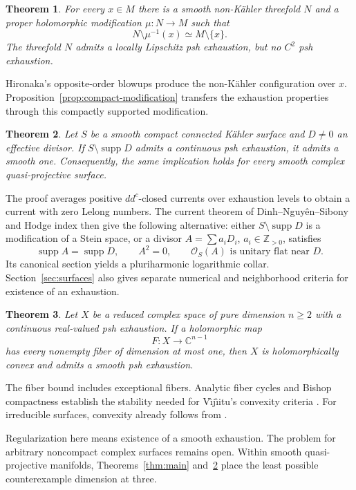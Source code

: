 \documentclass[11pt]{amsart}
\newtheorem{theorem}{Theorem}[section]
\theoremstyle{definition}
\theoremstyle{remark}
\numberwithin{equation}{section}
\newcommand{\C}{\mathbb C}
\newcommand{\OO}{\mathcal O}
\newcommand{\supp}{\operatorname{supp}}
\begin{document}
\begin{theorem}\label{thm:nonkahler-threefold}
For every $x\in M$ there is a smooth non-K\"ahler threefold $N$ and a
proper holomorphic modification $\mu:N\to M$ such that
\[
N\setminus\mu^{-1}(x)\simeq M\setminus\{x\}.
\]
The threefold $N$ admits a locally Lipschitz psh exhaustion, but no
$C^2$ psh exhaustion.
\end{theorem}

Hironaka's opposite-order blowups produce the non-K\"ahler
configuration over $x$. Proposition~\ref{prop:compact-modification}
transfers the exhaustion properties through this compactly supported
modification.

\begin{theorem}\label{thm:surface-introduction}
Let $S$ be a smooth compact connected K\"ahler surface and $D\ne0$
an effective divisor. If $S\setminus\supp D$ admits a continuous
psh exhaustion, it admits a smooth one. Consequently, the same
implication holds for every smooth complex quasi-projective surface.
\end{theorem}

The proof averages positive $dd^c$-closed currents over exhaustion
levels to obtain a current with zero Lelong numbers. The current
theorem of Dinh--Nguy\^en--Sibony \cite{DNS22} and Hodge index then
give the following alternative: either $S\setminus\supp D$ is a
modification of a Stein space, or a divisor
$A=\sum a_iD_i$, $a_i\in\mathbb Z_{>0}$, satisfies
\[
\supp A=\supp D,\qquad A^2=0,\qquad
\OO_S(A)\text{ is unitary flat near }D.
\]
Its canonical section yields a pluriharmonic logarithmic collar.
Section~\ref{sec:surfaces} also gives separate numerical and
neighborhood criteria for existence of an exhaustion.

\begin{theorem}\label{thm:curve-fiber-introduction}
Let $X$ be a reduced complex space of pure dimension $n\ge2$ with a
continuous real-valued psh exhaustion. If a holomorphic map
\[
F:X\longrightarrow\C^{n-1}
\]
has every nonempty fiber of dimension at most one, then $X$ is
holomorphically convex and admits a smooth psh exhaustion.
\end{theorem}

The fiber bound includes exceptional fibers. Analytic fiber cycles
and Bishop compactness establish
the stability needed for V\^{\i}j\^{\i}itu's convexity criteria
\cite{VijituForum2022}. For irreducible surfaces, convexity already
follows from \cite[Theorem~1.1]{Vajaitu2022}.

Regularization here means existence of a smooth exhaustion. The
problem for arbitrary noncompact complex surfaces remains open. Within smooth
quasi-projective manifolds, Theorems~\ref{thm:main}
and~\ref{thm:surface-introduction} place the least possible
counterexample dimension at three.
\end{document}
